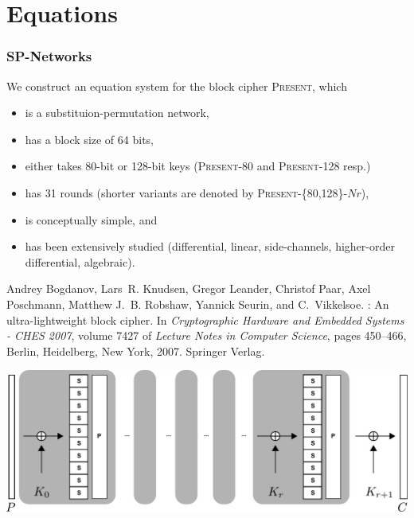 \documentclass[9pt]{beamer}
\newcommand{\PRESENT}{\textsc{Present}\xspace}
\begin{document}
\section{Equations}

\begin{frame}[allowframebreaks]
\frametitle{SP-Networks} 

We construct an equation system for the block cipher \PRESENT, which

\begin{itemize}
 \item is a substituion-permutation network,
 \item has a block size of 64 bits,
 \item either takes 80-bit or 128-bit keys (\PRESENT-80 and \PRESENT-128 resp.)
 \item has 31 rounds (shorter variants are denoted by \PRESENT-\{80,128\}-$Nr$),
 \item is conceptually simple, and
 \item has been extensively studied (differential, linear, side-channels, higher-order differential, algebraic).
\end{itemize}

\begin{small}
\begin{thebibliography}{present}
Andrey Bogdanov, Lars~R. Knudsen, Gregor Leander, Christof Paar, Axel
  Poschmann, Matthew J.~B. Robshaw, Yannick Seurin, and C.~Vikkelsoe.
: An ultra-lightweight block cipher.
\newblock In {\em Cryptographic Hardware and Embedded Systems - CHES 2007},
  volume 7427 of {\em Lecture Notes in Computer Science}, pages 450--466,
  Berlin, Heidelberg, New York, 2007. Springer Verlag.
\end{thebibliography}
\end{small}
\framebreak

\begin{center}
 \includegraphics[width=1.0\textwidth]{./spn-scheme.pdf}
\end{center}
\end{frame}
\end{document}
